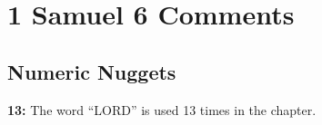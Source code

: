 \section{1 Samuel 6 Comments}

\subsection{Numeric Nuggets}
\textbf{13: } The word ``LORD'' is used 13 times in the chapter.